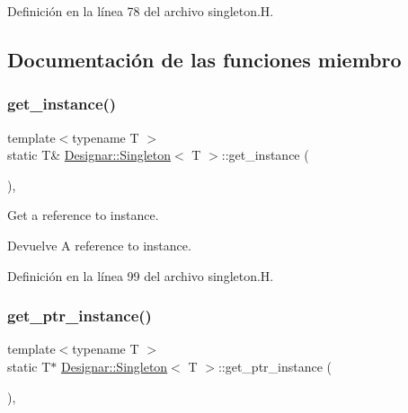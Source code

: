 Definición en la línea 78 del archivo singleton.\+H.



\subsection{Documentación de las funciones miembro}
\mbox{\label{class_designar_1_1_singleton_a747ab94efeaa0d985c194c2f91616075}} 
\subsubsection{\texorpdfstring{get\+\_\+instance()}{get\_instance()}}
{\footnotesize\ttfamily template$<$typename T $>$ \\
static T\& \hyperlink{class_designar_1_1_singleton}{Designar\+::\+Singleton}$<$ T $>$\+::get\+\_\+instance (\begin{DoxyParamCaption}{ }\end{DoxyParamCaption})\hspace{0.3cm}{\ttfamily [inline]}, {\ttfamily [static]}}

Get a reference to instance.

\begin{DoxyReturn}{Devuelve}
A reference to instance. 
\end{DoxyReturn}


Definición en la línea 99 del archivo singleton.\+H.

\mbox{\label{class_designar_1_1_singleton_a4246f5f346bda552c3f0b317792d2fe5}} 
\subsubsection{\texorpdfstring{get\+\_\+ptr\+\_\+instance()}{get\_ptr\_instance()}}
{\footnotesize\ttfamily template$<$typename T $>$ \\
static T$\ast$ \hyperlink{class_designar_1_1_singleton}{Designar\+::\+Singleton}$<$ T $>$\+::get\+\_\+ptr\+\_\+instance (\begin{DoxyParamCaption}{ }\end{DoxyParamCaption})\hspace{0.3cm}{\ttfamily [inline]}, {\ttfamily [static]}}

